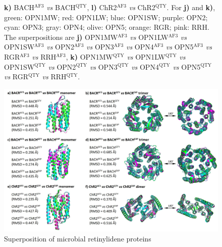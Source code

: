 \documentclass[fleqn, 10pt, lineno]{manuscript}
\begin{document}
\begin{figure}[htbp]
{    \textbf{k)} BACH$^{\textrm{AF3}}$ \textit{vs} BACH$^{\textrm{QTY}}$, 
    \textbf{l)} ChR2$^{\textrm{AF3}}$ \textit{vs} ChR2$^{\textrm{QTY}}$. 
    For \textbf{j)} and \textbf{k)}, green: OPN1MW; red: OPN1LW; blue: OPN1SW; purple: OPN2; cyan: OPN3; gray: OPN4; olive: OPN5; orange: RGR; pink: RRH. The superpositions are
    \textbf{j)} OPN1MW$^{\textrm{AF3}}$ \textit{vs} OPN1LW$^{\textrm{AF3}}$ \textit{vs} OPN1SW$^{\textrm{AF3}}$ \textit{vs} OPN2$^{\textrm{AF3}}$ \textit{vs} OPN3$^{\textrm{AF3}}$ \textit{vs} OPN4$^{\textrm{AF3}}$ \textit{vs} OPN5$^{\textrm{AF3}}$ \textit{vs} RGR$^{\textrm{AF3}}$ \textit{vs} RRH$^{\textrm{AF3}}$, 
    \textbf{k)} OPN1MW$^{\textrm{QTY}}$ \textit{vs} OPN1LW$^{\textrm{QTY}}$ \textit{vs} OPN1SW$^{\textrm{QTY}}$ \textit{vs} OPN2$^{\textrm{QTY}}$ \textit{vs} OPN3$^{\textrm{QTY}}$ \textit{vs} OPN4$^{\textrm{QTY}}$ \textit{vs} OPN5$^{\textrm{QTY}}$ \textit{vs} RGR$^{\textrm{QTY}}$ \textit{vs} RRH$^{\textrm{QTY}}$. 
    }
	\label{fig:humansup}
\end{figure}

\begin{figure}[htbp]
	\centering
	\includegraphics[width=\linewidth]{Figures/superposition-microbial.jpg}
	\caption{Superposition of microbial retinylidene proteins}
	\label{fig:microbialsup}
\end{figure}
\end{document}
